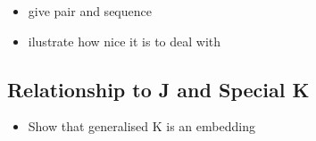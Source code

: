 \documentclass[runningheads]{llncs}
\begin{document}
\begin{itemize}
\tightlist
\item
  give pair and sequence
\end{itemize}

\begin{Shaded}
\begin{Highlighting}[]
 \OtherTok{{-}\textgreater{}} \OtherTok{{-}\textgreater{}} 
\OtherTok{=}\OtherTok{{-}\textgreater{}}\OtherTok{{-}\textgreater{}}
\end{Highlighting}
\end{Shaded}

\begin{Shaded}
\begin{Highlighting}[]
\NormalTok{ [}\NormalTok{ r a] }\OtherTok{{-}\textgreater{}} 
\OtherTok{=}\OtherTok{{-}\textgreater{}}
\OperatorTok{:}\OtherTok{=}\OtherTok{{-}\textgreater{}}\OtherTok{{-}\textgreater{}}\OperatorTok{:}
\end{Highlighting}
\end{Shaded}

\begin{itemize}
\tightlist
\item
  ilustrate how nice it is to deal with
\end{itemize}

\subsection{Relationship to J and Special
K}\label{relationship-to-j-and-special-k}

\begin{itemize}
\tightlist
\item
  Show that generalised K is an embedding
\end{itemize}

\begin{Shaded}
\begin{Highlighting}[]
 \OtherTok{{-}\textgreater{}} 
\OtherTok{=}  
\end{Highlighting}
\end{Shaded}
\end{document}
